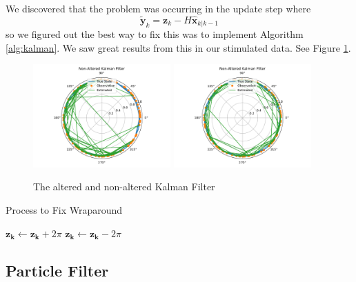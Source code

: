 \documentclass[11pt]{amsart}
\begin{document}
We discovered that the problem was occurring in the update step where \[\mathbf{\tilde{y}}_k = \mathbf{z}_k - H\mathbf{\hat{x}}_{k|k-1}\]
so we figured out the best way to fix this was to implement Algorithm \ref{alg:kalman}. We saw great results from this in our stimulated data.
See Figure \ref{fig:simple_kalman}.

\begin{figure}[htp]
    \centering
    \includegraphics[width=0.47\textwidth]{non_altered_kalman.pdf}\hfill
    \includegraphics[width=0.47\textwidth]{altered_kalman.pdf}\hfill
    \caption{The altered and non-altered Kalman Filter}
    \label{fig:simple_kalman}
\end{figure}



\begin{algorithm}
    \caption{Process to Fix Wraparound}\label{alg:kalman}    
    \begin{algorithmic}
            \State $\mathbf{z_k} \gets \mathbf{z_k} + 2\pi$
            \State $\mathbf{z_k} \gets \mathbf{z_k} - 2\pi$
        \EndIf 
        \end{algorithmic}
    \end{algorithm}


\subsection{Particle Filter}
\end{document}
